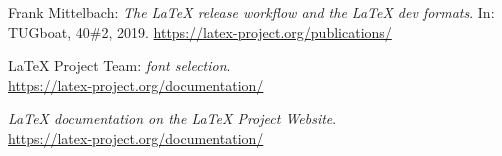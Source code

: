 \documentclass{ltnews}
\begin{document}
\begin{thebibliography}{9}


 Frank Mittelbach:
  \emph{The
  \LaTeX{} release workflow and the \LaTeX{} dev formats}.
  In: TUGboat, 40\#2, 2019.
  \url{https://latex-project.org/publications/}

 \LaTeX{} Project Team:
  \emph{\LaTeXe{} font selection}.\\
  \url{https://latex-project.org/documentation/}

  \emph{\LaTeX{} documentation on the \LaTeX{} Project Website}.\\
  \url{https://latex-project.org/documentation/}


\end{thebibliography}
\end{document}
